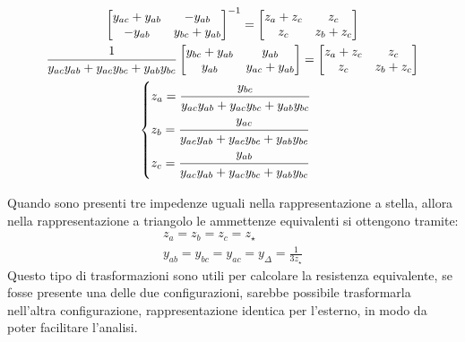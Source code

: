 \documentclass{article}
\numberwithin{equation}{subsection}
\begin{document}
\begin{gather*}
    \begin{bmatrix}
        y_{ac}+y_{ab}&-y_{ab}\\-y_{ab}&y_{bc}+y_{ab}
    \end{bmatrix}^{-1}=\begin{bmatrix}
        z_a+z_c&z_c\\z_c&z_b+z_c
    \end{bmatrix}\\
    \displaystyle\frac{1}{y_{ac}y_{ab}+y_{ac}y_{bc}+y_{ab}y_{bc}}\begin{bmatrix}
        y_{bc}+y_{ab}&y_{ab}\\y_{ab}&y_{ac}+y_{ab}
    \end{bmatrix}=\begin{bmatrix}
        z_a+z_c&z_c\\z_c&z_b+z_c
    \end{bmatrix}\\
    \begin{cases}
        z_a=\displaystyle\frac{\strut y_{bc}}{\strut y_{ac}y_{ab}+y_{ac}y_{bc}+y_{ab}y_{bc}}\\
        z_b=\displaystyle\frac{\strut y_{ac}}{\strut y_{ac}y_{ab}+y_{ac}y_{bc}+y_{ab}y_{bc}}\\
        z_c=\displaystyle\frac{\strut y_{ab}}{\strut y_{ac}y_{ab}+y_{ac}y_{bc}+y_{ab}y_{bc}}
    \end{cases}
\end{gather*}


Quando sono presenti tre impedenze uguali nella rappresentazione a stella, allora nella rappresentazione a triangolo le ammettenze equivalenti si ottengono tramite:
\begin{gather*}
    z_a=z_b=z_c=z_{\star}\\
    y_{ab}=y_{bc}=y_{ac}=y_{\Delta}=\displaystyle\frac{1}{3z_{\star}}
\end{gather*}
Questo tipo di trasformazioni sono utili per calcolare la resistenza equivalente, se fosse presente una delle due configurazioni, sarebbe possibile trasformarla 
nell'altra configurazione, rappresentazione identica per l'esterno, in modo da poter facilitare l'analisi. 
\end{document}

